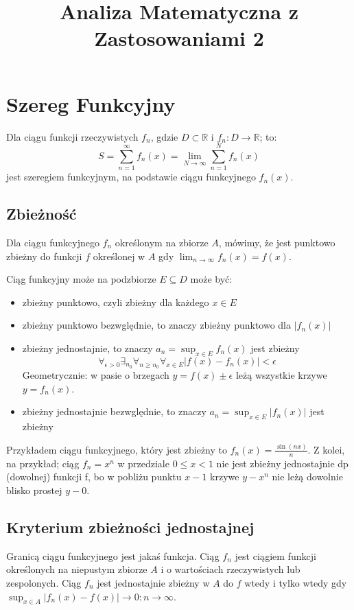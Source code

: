 \documentclass{../notatki}
\title{Analiza Matematyczna z Zastosowaniami 2}
\begin{document}
\section{Szereg Funkcyjny}

Dla ciągu funkcji rzeczywistych $f_n$, gdzie $D \subset \mathbb{R}$ i
$f_n: D \to \mathbb{R}$; to:
$$
S = \sum_{n=1}^{\infty} f_n(x) = \lim_{N \to \infty} \sum_{n=1}^{N} f_n(x)
$$
jest szeregiem funkcyjnym, na podstawie ciągu funkcyjnego $f_n(x)$.

\subsection{Zbieżność}

Dla ciągu funkcyjnego $f_n$ określonym na zbiorze $A$, mówimy, że jest
punktowo zbieżny do funkcji $f$ określonej w $A$ gdy $\lim_{n \to
\infty} f_n(x) = f(x)$.

Ciąg funkcyjny może na podzbiorze $E \subseteq D$ może być:
\begin{itemize}
  \item zbieżny punktowo, czyli zbieżny dla każdego $x \in E$
  \item zbieżny punktowo bezwględnie, to znaczy zbieżny punktowo dla $|f_n(x)|$
  \item zbieżny jednostajnie, to znaczy $a_n = \sup_{x \in E} f_n(x)$
    jest zbieżny
    $$
    \forall_{\epsilon > 0} \exists_{n_0} \forall_{n \ge n_0}
    \forall_{x \in E} |f(x) - f_n(x)| < \epsilon
    $$
    Geometrycznie: w pasie o brzegach $y = f(x) \pm \epsilon$ leżą wszystkie
    krzywe $y = f_n(x)$.
  \item zbieżny jednostajnie bezwględnie, to znaczy $a_n = \sup_{x
    \in E} |f_n(x)|$ jest zbieżny
\end{itemize}

Przykładem ciągu funkcyjnego, który jest zbieżny to $f_n(x) =
\frac{\sin(nx)}{n}$. Z kolei, na przykład; ciąg $f_n = x^n$ w przedziale
$0 \le x < 1$ nie jest zbieżny jednostajnie dp (dowolnej) funkcji f, bo w
pobliżu punktu $x - 1$ krzywe $y - x^n$ nie leżą dowolnie blisko prostej
$y - 0$.

\subsection{Kryterium zbieżności jednostajnej}

Granicą ciągu funkcyjnego jest jakaś funkcja. Ciąg $f_n$ jest ciągiem funkcji
określonych na niepustym zbiorze $A$ i o wartościach rzeczywistych lub
zespolonych. Ciąg $f_n$ jest jednostajnie zbieżny w $A$ do $f$ wtedy i tylko
wtedy gdy $\sup_{x \in A} |f_n(x) - f(x)| \to 0: n \to \infty$.
\end{document}
